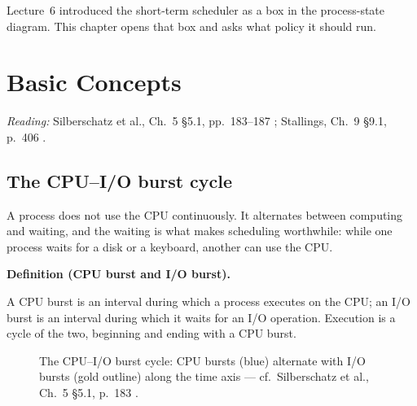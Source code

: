 \documentclass[11pt]{article}
\newenvironment{definitionbox}[1]{%
  \par\noindent\textbf{Definition (#1).}\ \itshape
}{\par\vspace{0.3em}}
\begin{document}
\noindent Lecture~6 introduced the short-term scheduler as a box in the
process-state diagram. This chapter opens that box and asks what policy it
should run.

\section{Basic Concepts}
\label{sec:concepts}

\noindent\emph{Reading:} Silberschatz et al., Ch.~5 \S5.1, pp.~183--187
\cite{SilberschatzOSC_operating_system_concepts}; Stallings, Ch.~9 \S9.1,
p.~406 \cite{StallingsOS_internals_design_principles}.

\subsection*{The CPU--I/O burst cycle}

A process does not use the CPU continuously. It alternates between computing
and waiting, and the waiting is what makes scheduling worthwhile: while one
process waits for a disk or a keyboard, another can use the CPU.

\begin{definitionbox}{CPU burst and I/O burst}
A CPU burst is an interval during which a process executes on the CPU; an I/O
burst is an interval during which it waits for an I/O operation. Execution is a
cycle of the two, beginning and ending with a CPU burst.
\end{definitionbox}

\begin{figure}[h]
\centering
{}
\caption{The CPU--I/O burst cycle: CPU bursts (blue) alternate with I/O bursts
(gold outline) along the time axis --- cf.\ Silberschatz et al., Ch.~5 \S5.1,
p.~183 \cite{SilberschatzOSC_operating_system_concepts}.}
\label{fig:burst}
\end{figure}
\end{document}
